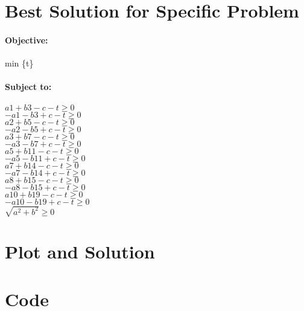 \documentclass{article}
\begin{document}
\section*{Best Solution for Specific Problem}
\paragraph*{Objective:}
min \{t\}

\paragraph*{Subject to:\\}
$a1 + b3 - c -t \geq 0$\\
$-a1 - b3 + c -t \geq 0$\\
$a2 + b5 - c -t \geq 0$\\
$-a2 - b5 + c -t \geq 0$\\
$a3 + b7 - c -t \geq 0$\\
$-a3 - b7 + c -t \geq 0$\\
$a5 + b11 - c -t \geq 0$\\
$-a5 - b11 + c -t \geq 0$\\
$a7 + b14 - c -t \geq 0$\\
$-a7 - b14 + c -t \geq 0$\\
$a8 + b15 - c -t \geq 0$\\
$-a8 - b15 + c -t \geq 0$\\
$a10 + b19 - c -t \geq 0$\\
$-a10 - b19 + c -t \geq 0$\\
$\sqrt{a^2 + b^2} \geq 0$


\section*{Plot and Solution}

\section*{Code}
\end{document}
